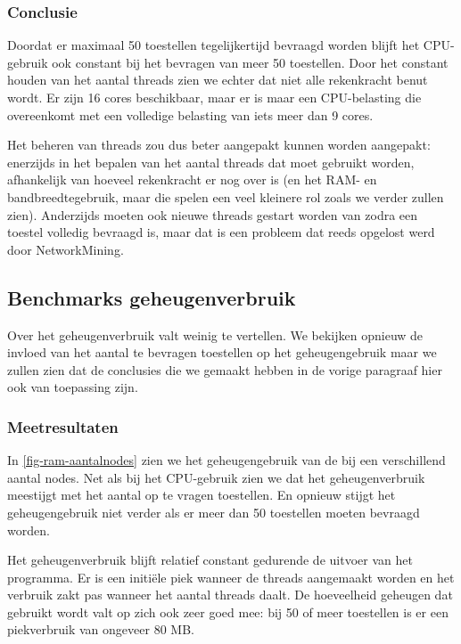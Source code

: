 \subsubsection{Conclusie}

Doordat er maximaal 50 toestellen tegelijkertijd bevraagd worden blijft het CPU-gebruik ook constant bij het bevragen van meer 50 toestellen.
Door het constant houden van het aantal threads zien we echter dat niet alle rekenkracht benut wordt.
Er zijn 16 cores beschikbaar, maar er is maar een CPU-belasting die overeenkomt met een volledige belasting van iets meer dan 9 cores.

Het beheren van threads zou dus beter aangepakt kunnen worden aangepakt:
enerzijds in het bepalen van het aantal threads dat moet gebruikt worden, afhankelijk van hoeveel rekenkracht er nog over is
(en het RAM- en bandbreedtegebruik, maar die spelen een veel kleinere rol zoals we verder zullen zien).
Anderzijds moeten ook nieuwe threads gestart worden van zodra een toestel volledig bevraagd is,
maar dat is een probleem dat reeds opgelost werd door NetworkMining.

\subsection{Benchmarks geheugenverbruik}

Over het geheugenverbruik valt weinig te vertellen.
We bekijken opnieuw de invloed van het aantal te bevragen toestellen op het geheugengebruik maar
we zullen zien dat de conclusies die we gemaakt hebben in de vorige paragraaf hier ook van toepassing zijn.

\subsubsection{Meetresultaten}

In \cref{fig-ram-aantalnodes} zien we het geheugengebruik van de \nwmretriever{} bij een verschillend aantal nodes.
Net als bij het CPU-gebruik zien we dat het geheugenverbruik meestijgt met het aantal op te vragen toestellen.
En opnieuw stijgt het geheugengebruik niet verder als er meer dan 50 toestellen moeten bevraagd worden.

Het geheugenverbruik blijft relatief constant gedurende de uitvoer van het programma.
Er is een initiële piek wanneer de threads aangemaakt worden en het verbruik zakt pas wanneer het aantal threads daalt.
De hoeveelheid geheugen dat gebruikt wordt valt op zich ook zeer goed mee: bij 50 of meer toestellen is er een piekverbruik van ongeveer 80 MB.

